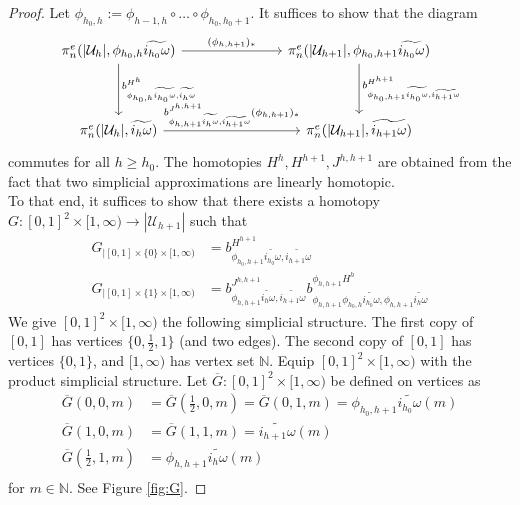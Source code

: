 \documentclass[a4paper,11pt]{article}
\theoremstyle{definition}
\theoremstyle{plain}
\theoremstyle{remark}
\begin{document}
{\begin{proof} Let $\phi_{h_0,h}:= \phi_{h-1,h}\circ \dots \circ \phi_{h_0,h_0+1}$. It suffices to show that the diagram 
\[
\begin{tikzcd}
\pi_{n}^{e}(|\mathcal{U}_{h}|, \phi_{h_0,h}\widetilde{i_{h_0}\omega}) \arrow{rrr}{(\phi_{h,h+1})_{\ast}} \arrow{dd}{b^{H^{h}}_{ \phi_{h_0,h}\widetilde{i_{h_0}\omega},\widetilde{i_{h}\omega}}} &&& \pi_{n}^{e}(|\mathcal{U}_{h+1}|, \phi_{h_0,h+1}\widetilde{i_{h_0}\omega})\arrow{dd}{b^{H^{h+1}}_{ \phi_{h_0,h+1}\widetilde{i_{h_0}\omega},\widetilde{i_{h+1}\omega}}} \\
\\
\pi_{n}^{e}(|\mathcal{U}_{h}|, \widetilde{i_{h}\omega})  \arrow{rrr}{b^{J^{h,h+1}}_{ \phi_{h,h+1}\widetilde{i_{h}\omega},\widetilde{i_{h+1}\omega}}(\phi_{h,h+1})_{\ast}} &&&\pi_{n}^{e}(|\mathcal{U}_{h+1}|, \widetilde{i_{h+1}\omega})
\end{tikzcd}
\]
commutes for all $h\geq h_0$. The homotopies $H^{h}, H^{h+1},J^{h,h+1}$ are obtained from the fact that two simplicial approximations are linearly homotopic. \\

To that end, it suffices to show that there exists a homotopy $G: [0,1]^2 \times [1,\infty)\rightarrow |\mathcal{U}_{h+1}|$ such that 
\begin{align*}
G_{|[0,1] \times \{0\} \times [1,\infty)} &= b^{H^{h+1}}_{ \phi_{h_0,h+1}\widetilde{i_{h_0}\omega},\widetilde{i_{h+1}\omega}}\\
G_{|[0,1] \times \{1\} \times [1,\infty)} &= b^{J^{h,h+1}}_{ \phi_{h,h+1}\widetilde{i_{h}\omega},\widetilde{i_{h+1}\omega}} b^{\phi_{h,h+1}H^{h}}_{ \phi_{h,h+1}\phi_{h_0,h}\widetilde{i_{h_0}\omega},\phi_{h,h+1}\widetilde{i_{h}\omega}}
\end{align*}
We give $[0,1]^2 \times [1,\infty)$ the following simplicial structure. The first copy of $[0,1]$ has vertices $\{0,\frac{1}{2},1\}$ (and two edges). The second copy of $[0,1]$ has vertices $\{0,1\}$, and $[1,\infty)$ has vertex set $\mathbb{N}$. Equip $[0,1]^2 \times [1,\infty)$ with the product simplicial structure. Let $\overline{G}: [0,1]^2 \times [1,\infty)$ be defined  on vertices as 
\begin{align*}
\overline{G}(0,0,m) &= \overline{G}(\frac{1}{2},0,m) =\overline{G}(0,1,m) =   \phi_{h_0,h+1} \widetilde{i_{h_0}\omega} (m)\\
\overline{G}(1,0,m) &= \overline{G}(1,1,m)=  \widetilde{i_{h+1}\omega}(m)\\
\overline{G}(\frac{1}{2},1,m) &= \phi_{h,h+1}\widetilde{i_{h}\omega}(m)\\
\end{align*}
for $m\in \mathbb{N}$. See Figure \ref{fig:G}. 


\end{proof}}
\end{document}
